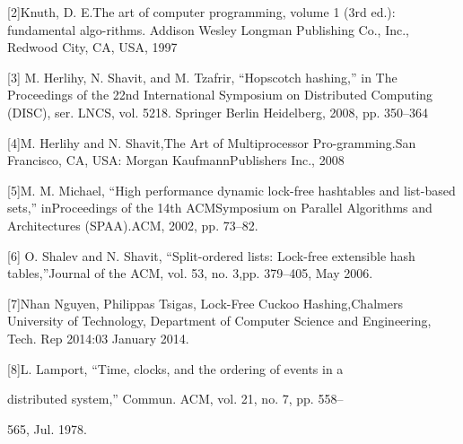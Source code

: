 \documentclass{article}
\begin{document}
[2]Knuth, D. E.The art of computer programming, volume 1 (3rd ed.): fundamental algo-rithms. Addison Wesley Longman
Publishing Co., Inc., Redwood City, CA, USA, 1997

[3] M. Herlihy, N. Shavit, and M. Tzafrir, ``Hopscotch hashing,'' in The Proceedings of the 22nd International Symposium
on Distributed Computing (DISC), ser. LNCS, vol. 5218. Springer Berlin Heidelberg, 2008, pp. 350--364

[4]M. Herlihy and N. Shavit,The Art of Multiprocessor Pro-gramming.San Francisco, CA, USA: Morgan KaufmannPublishers
Inc., 2008

[5]M. M. Michael, ``High performance dynamic lock-free hashtables and list-based sets,'' inProceedings of the 14th
ACMSymposium on Parallel Algorithms and Architectures (SPAA).ACM, 2002, pp. 73--82.

[6] O. Shalev and N. Shavit, ``Split-ordered lists: Lock-free extensible hash tables,''Journal of the ACM, vol. 53, no.
3,pp. 379--405, May 2006.

[7]Nhan Nguyen, Philippas Tsigas, {\textquotedbl}Lock-Free Cuckoo Hashing{\textquotedbl},Chalmers University of
Technology, Department of Computer Science and Engineering, Tech. Rep 2014:03 January 2014.

[8]L. Lamport, ``Time, clocks, and the ordering of events in a

distributed system,'' Commun. ACM, vol. 21, no. 7, pp. 558--

565, Jul. 1978.


\bigskip
\end{document}
